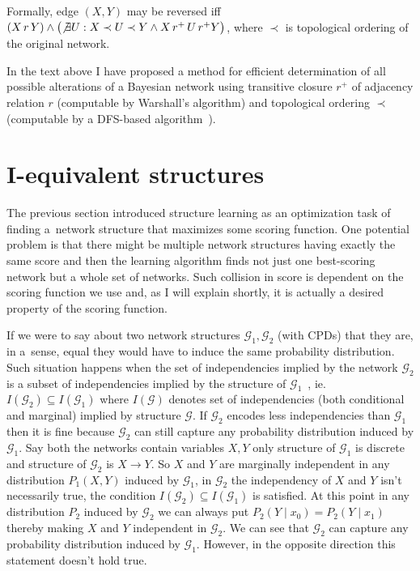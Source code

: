 \documentclass[english,cover]{fitthesis} %
\begin{document}
Formally, edge $(X,Y)$ may be reversed iff $(X \, r \, Y) \land \bigl(\not \exists U: X \prec U \prec Y \land X \, r^+ \, U \, r^+Y \bigr)$, where $\prec$ is topological ordering of the original network.

\medskip
In the text above I have proposed a method for efficient determination of all possible alterations of a Bayesian network using transitive closure $r^+$ of adjacency relation $r$ (computable by Warshall's algorithm) and topological ordering $\prec$ (computable by a DFS-based algorithm~\cite{cormen_introduction_to_algorithms}).






\section{I-equivalent structures}
The previous section introduced structure learning as an optimization task of finding a~network structure that maximizes some scoring function. One potential problem is that there might be multiple network structures having exactly the same score and then the learning algorithm finds not just one best-scoring network but a whole set of networks. Such collision in score is dependent on the scoring function we use and, as I will explain shortly, it is actually a desired property of the scoring function.

If we were to say about two network structures $\mathcal{G}_1, \mathcal{G}_2$ (with CPDs) that they are, in a~sense, equal they would have to induce the same probability distribution. Such situation happens when the set of independencies implied by the network $\mathcal{G}_2$ is a subset of independencies implied by the structure of $\mathcal{G}_1$~\cite[p.~76]{pgm}, ie. $I(\mathcal{G}_2) \subseteq I(\mathcal{G}_1)$ where $I(\mathcal{G})$ denotes set of independencies (both conditional and marginal) implied by structure $\mathcal{G}$. If $\mathcal{G}_2$ encodes less independencies than $\mathcal{G}_1$ then it is fine because $\mathcal{G}_2$ can still capture any probability distribution induced by $\mathcal{G}_1$. Say both the networks contain variables $X,Y$ only structure of $\mathcal{G}_1$ is discrete and structure of $\mathcal{G}_2$ is $X \rightarrow Y$. So $X$ and $Y$ are marginally independent in any distribution $P_1(X,Y)$ induced by $\mathcal{G}_1$, in $\mathcal{G}_2$ the independency of $X$ and $Y$ isn't necessarily true, the condition $I(\mathcal{G}_2) \subseteq I(\mathcal{G}_1)$ is satisfied. At this point in any distribution $P_2$ induced by $\mathcal{G}_2$ we can always put $P_2(Y \mid x_0) = P_2(Y \mid x_1)$ thereby making $X$ and $Y$ independent in $\mathcal{G}_2$. We can see that $\mathcal{G}_2$ can capture any probability distribution induced by $\mathcal{G}_1$. However, in the opposite direction this statement doesn't hold true.
\end{document}
